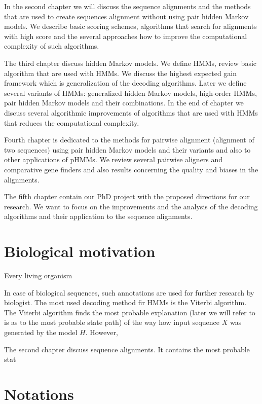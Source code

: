 In the second chapter we will discuss the sequence alignments and the methods
that are used to create sequences alignment without using pair hidden Markov
models. We describe basic scoring schemes, algorithms that search for alignments
with high score and the several approaches how to improve the computational
complexity of such algorithms.

The third chapter discuss hidden Markov models. We define HMMs, review basic
algorithm that are used with HMMs. We discuss the highest expected gain
framework which is generalization of the decoding algorithms. Later we define
several variants of HMMs: generalized hidden Markov models, high-order HMMs,
pair hidden Markov models and their combinations. In the end of chapter we
discuss several algorithmic improvements of algorithms that are used with HMMs
that reduces the computational complexity.

Fourth chapter is dedicated to the methods for pairwise alignment (alignment of
two sequences) using pair hidden Markov models and their variants and also to
other applications of pHMMs. We review several pairwise aligners and comparative
gene finders and also results concerning the quality and biases in the
alignments.

The fifth chapter contain our PhD project with the proposed directions for our
research. We want to focus on the improvements and the analysis of the decoding
algorithms and their application to the sequence alignments. 

\section{Biological motivation}


Every living organism

In case of biological
sequences, such annotations are used for further research by biologist.
The most used decoding method fir HMMs is the Viterbi algorithm. The Viterbi
algorithm finds the most probable explanation (later we will refer to is as to
the most probable state path) of the way how input sequence $X$ was generated by
the model $H$. However, 

The second chapter discuss sequence alignments. It contains the most probable
stat

\section{Notations}

